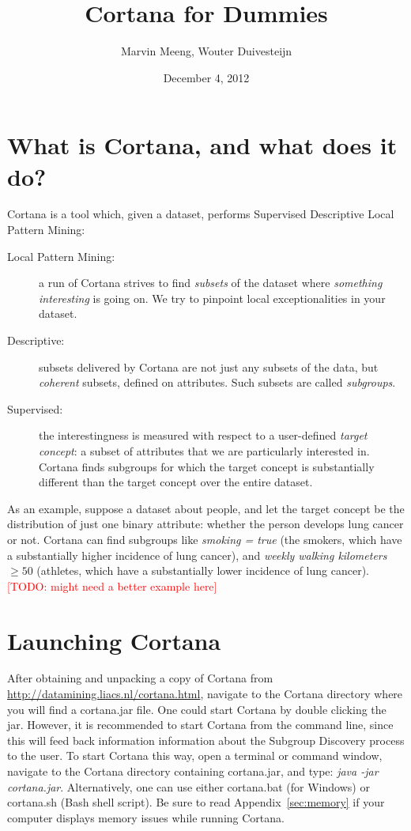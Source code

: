 \documentclass{article}
\title{Cortana for Dummies}
\author{Marvin Meeng, Wouter Duivesteijn}
\date{December 4, 2012}
\newcommand{\todo}[1]{\textcolor{red}{[TODO: #1]}}
\begin{document}
\maketitle

\section{What is Cortana, and what does it do?}
\label{sec:intro}

Cortana is a tool which, given a dataset, performs Supervised Descriptive
Local Pattern Mining:
\begin{description}
\item[Local Pattern Mining:] a run of Cortana strives to find \emph{subsets}
of the dataset where \emph{something interesting} is going on. We try to
pinpoint local exceptionalities in your dataset.
\item[Descriptive:] subsets delivered by Cortana are not just any subsets of
the data, but \emph{coherent} subsets, defined on attributes. Such subsets
are called \emph{subgroups}.
\item[Supervised:] the interestingness is measured with respect to a
user-defined \emph{target concept}: a subset of attributes that we are
particularly interested in. Cortana finds subgroups for which the target
concept is substantially different than the target concept over the entire
dataset.
\end{description}

As an example,
suppose a dataset about people, and let the target concept be the
distribution of just one binary attribute: whether the person develops lung
cancer or not.  Cortana can find subgroups like \emph{smoking = true} (the
smokers, which have a substantially higher incidence of lung cancer), and
\emph{weekly walking kilometers} $\geq 50$ (athletes, which have a
substantially lower incidence of lung cancer).
\todo{might need a better example here}

\section{Launching Cortana}

After obtaining and unpacking a copy of Cortana from
\url{http://datamining.liacs.nl/cortana.html}, navigate to the Cortana
directory where you will find a cortana.jar file.  One could start Cortana
by double clicking the jar.  However, it is recommended to start Cortana
from the command line, since this will feed back information information
about the Subgroup Discovery process to the user.  To start Cortana this
way, open a terminal or command window, navigate to the Cortana directory
containing cortana.jar, and type: \emph{java -jar cortana.jar}. 
Alternatively, one can use either cortana.bat (for Windows) or cortana.sh
(Bash shell script).  Be sure to read Appendix~\ref{sec:memory} if your
computer displays memory issues while running Cortana.
\end{document}
